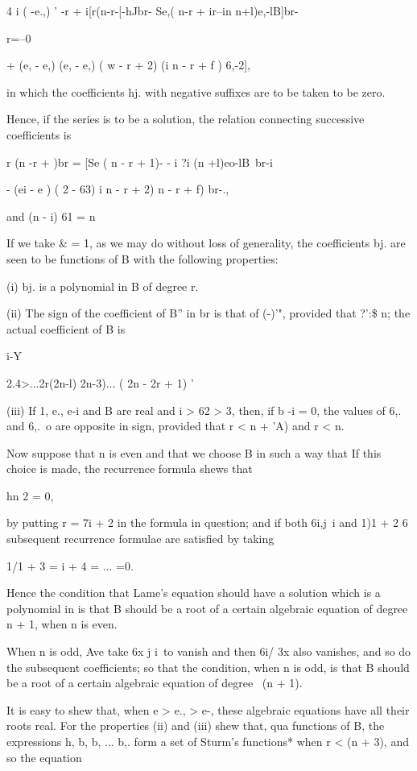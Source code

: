 {{{{4 i ( -e.,) ' -r + i[r(n-r-[-hJbr- Se,( n-r + ir--in n+l)e,-lB]br-

r=--0

+ (e, - e,) (e, - e,) ( w - r + 2) (i n - r + f ) 6,-2],

in which the coefficients hj. with negative suffixes are to be taken
to be zero.

Hence, if the series is to be a solution, the relation connecting
successive coefficients is

r (n -r + )br = [Se ( n - r + 1)- - i ?i (n +l)eo-lB\ br-i

- (ei - e ) ( 2 - 63) i n - r + 2) n - r + f) br-.,

and (n - i) 61 = n%

If we take \& = 1, as we may do without loss of generality, the
coefficients bj. are seen to be functions of B with the following
properties:

(i) bj. is a polynomial in B of degree r.

(ii) The sign of the coefficient of B'' in br is that of (-)'",
provided that ?':\$ n; the actual coefficient of B is

i-Y

2.4>...2r(2n-l) 2n-3)... ( 2n - 2r + 1) '

(iii) If 1, e., e-i and B are real and i > 62 > 3, then, if b -i = 0,
the values of 6,. and 6,.\ o are opposite in sign, provided that r < n
+ 'A) and r < n.

Now suppose that n is even and that we choose B in such a way that If
this choice is made, the recurrence formula shews that

hn 2 = 0,

%
%

by putting r = 7i + 2 in the formula in question; and if both 6i,j\ i
and 1)1 + 2 6 subsequent recurrence formulae are satisfied by taking

 1/1 + 3 = i + 4 = ... =0.

Hence the condition that Lame's equation should have a solution which
is a polynomial in is that B should be a root of a certain algebraic
equation of degree n + 1, when n is even.

When n is odd, Ave take 6x j i\ to vanish and then 6i/ 3x also
vanishes, and so do the subsequent coefficients; so that the
condition, when n is odd, is that B should be a root of a certain
algebraic equation of degree \ (n + 1).

It is easy to shew that, when e > e., > e-, these algebraic equations
have all their roots real. For the properties (ii) and (iii) shew
that, qua functions of B, the expressions h, b, b, ... b,. form a
set of Sturm's functions* when r < (n + 3), and so the equation

}}}}
